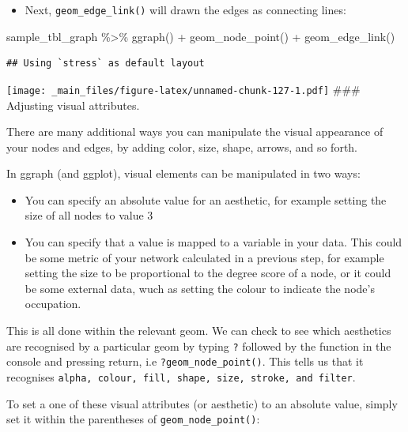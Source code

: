 \documentclass[
]{book}
\newenvironment{Shaded}{\begin{snugshade}}{\end{snugshade}}
\newcommand{\FunctionTok}[1]{\textcolor[rgb]{0.00,0.00,0.00}{#1}}
\newcommand{\NormalTok}[1]{#1}
\newcommand{\SpecialCharTok}[1]{\textcolor[rgb]{0.00,0.00,0.00}{#1}}
\providecommand{\tightlist}{%
  \setlength{\itemsep}{0pt}\setlength{\parskip}{0pt}}
\begin{document}
\begin{itemize}
\tightlist
\item
  Next, \texttt{geom\_edge\_link()} will drawn the edges as connecting lines:
\end{itemize}

\begin{Shaded}
\begin{Highlighting}[]
\NormalTok{sample\_tbl\_graph }\SpecialCharTok{\%\textgreater{}\%} 
  \FunctionTok{ggraph}\NormalTok{() }\SpecialCharTok{+} 
  \FunctionTok{geom\_node\_point}\NormalTok{() }\SpecialCharTok{+} 
  \FunctionTok{geom\_edge\_link}\NormalTok{()}
\end{Highlighting}
\end{Shaded}

\begin{verbatim}
## Using `stress` as default layout
\end{verbatim}

\texttt{[image: \_main\_files/figure-latex/unnamed-chunk-127-1.pdf]}
\#\#\# Adjusting visual attributes.

There are many additional ways you can manipulate the visual appearance of your nodes and edges, by adding color, size, shape, arrows, and so forth.

In ggraph (and ggplot), visual elements can be manipulated in two ways:

\begin{itemize}
\tightlist
\item
  You can specify an absolute value for an aesthetic, for example setting the size of all nodes to value 3
\item
  You can specify that a value is mapped to a variable in your data. This could be some metric of your network calculated in a previous step, for example setting the size to be proportional to the degree score of a node, or it could be some external data, wuch as setting the colour to indicate the node's occupation.
\end{itemize}

This is all done within the relevant geom. We can check to see which aesthetics are recognised by a particular geom by typing \texttt{?} followed by the function in the console and pressing return, i.e \texttt{?geom\_node\_point()}. This tells us that it recognises \texttt{alpha,\ colour,\ fill,\ shape,\ size,\ stroke,\ and\ filter}.

To set a one of these visual attributes (or aesthetic) to an absolute value, simply set it within the parentheses of \texttt{geom\_node\_point()}:
\end{document}
